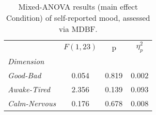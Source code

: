 \begin{table}[h]
\centering
\caption{Mixed-ANOVA results (main effect Condition) of self-reported mood, assessed via MDBF.}
\label{tab:tab_questionnaire_mdbf_main_effect_condition}

\begin{tabular}{l||SSS}
\toprule
{} & {$F(1, 23)$} &         {p} & {$\eta^2_p$} \\
\textit{Dimension}    &              &             &              \\
\midrule
\textit{Good-Bad}     &        0.054 &  0.819$^{}$ &        0.002 \\
\textit{Awake-Tired}  &        2.356 &  0.139$^{}$ &        0.093 \\
\textit{Calm-Nervous} &        0.176 &  0.678$^{}$ &        0.008 \\
\bottomrule
\end{tabular}
\end{table}
